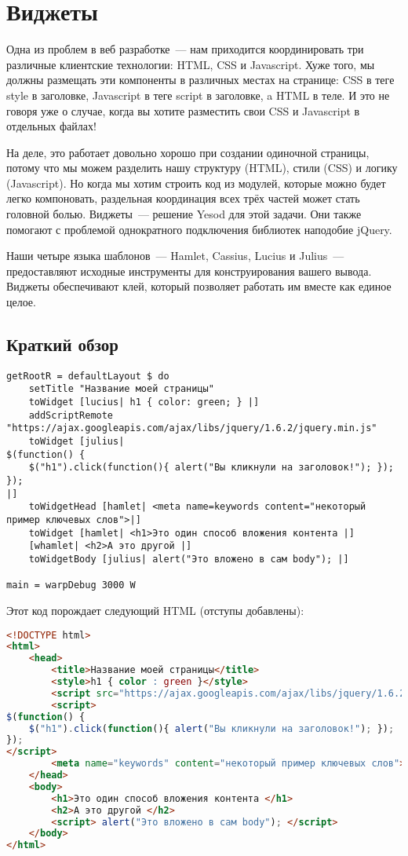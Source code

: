 \chapter{Виджеты}

Одна из проблем в веб разработке~--- нам приходится координировать три различные клиентские технологии: HTML, CSS и Javascript. Хуже того, мы должны размещать эти компоненты в различных местах на странице: CSS в теге style в заголовке, Javascript в теге script в заголовке, a HTML в теле. И это не говоря уже о случае, когда вы хотите разместить свои CSS и Javascript в отдельных файлах!

На деле, это работает довольно хорошо при создании одиночной страницы, потому что мы можем разделить нашу структуру (HTML), стили (CSS) и логику (Javascript). Но когда мы хотим строить код из модулей, которые можно будет легко компоновать, раздельная координация всех трёх частей может стать головной болью. Виджеты~--- решение Yesod для этой задачи. Они также помогают с проблемой однократного подключения библиотек наподобие jQuery.

Наши четыре языка шаблонов~--- Hamlet, Cassius, Lucius и Julius~--- предоставляют исходные инструменты для конструирования вашего вывода. Виджеты обеспечивают клей, который позволяет работать им вместе как единое целое.

\section{Краткий обзор}

\begin{lstlisting}
getRootR = defaultLayout $ do
    setTitle "Название моей страницы"
    toWidget [lucius| h1 { color: green; } |]
    addScriptRemote "https://ajax.googleapis.com/ajax/libs/jquery/1.6.2/jquery.min.js"
    toWidget [julius|
$(function() {
    $("h1").click(function(){ alert("Вы кликнули на заголовок!"); });
});
|]
    toWidgetHead [hamlet| <meta name=keywords content="некоторый пример ключевых слов">|]
    toWidget [hamlet| <h1>Это один способ вложения контента |]
    [whamlet| <h2>А это другой |]
    toWidgetBody [julius| alert("Это вложено в сам body"); |]

main = warpDebug 3000 W
\end{lstlisting}

Этот код порождает следующий HTML (отступы добавлены):

\begin{lstlisting}[language=HTML]
<!DOCTYPE html>
<html>
    <head>
        <title>Название моей страницы</title>
        <style>h1 { color : green }</style>
        <script src="https://ajax.googleapis.com/ajax/libs/jquery/1.6.2/jquery.min.js"></script>
        <script>
$(function() {
    $("h1").click(function(){ alert("Вы кликнули на заголовок!"); });
});
</script>
        <meta name="keywords" content="некоторый пример ключевых слов">
    </head>
    <body>
        <h1>Это один способ вложения контента </h1>
        <h2>А это другой </h2>
        <script> alert("Это вложено в сам body"); </script>
    </body>
</html>
\end{lstlisting}

